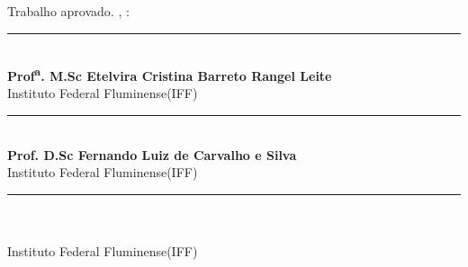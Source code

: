 \documentclass[
	12pt,				%
	openright,			%
	oneside,			%
	a4paper,			%
	english,			%
	french,				%
	spanish,			%
	brazil,				%
	]{abntex2}
\renewcommand{\assinatura}[1]{%
  \vspace{1cm}
  \begin{center}
    \begin{minipage}{0.9\textwidth}
      \centering
      \rule{12cm}{0.4pt}\\ %
      #1
    \end{minipage}
  \end{center}
}
\begin{document}
\renewcommand{\lstlistingname}{Listagem}


\frenchspacing


\imprimircapa

\imprimirfolhaderosto

\begin{folhadeaprovacao}
    \begin{center}
{\ABNTEXchapterfont\large\imprimirautor}

\vspace*{\fill}

\ABNTEXchapterfont\bfseries\Large\imprimirtitulo
\end{center}
\vspace*{\fill}

\hspace{.45\textwidth}
\begin{minipage}{.5\textwidth}
\SingleSpacing
    \imprimirpreambulo
\end{minipage}%
\vspace*{\fill}

Trabalho aprovado. \imprimirlocal, \imprimirdata:
\assinatura{\textbf{Prof\textsuperscript{a}. M.Sc Etelvira Cristina Barreto Rangel Leite} \\ Instituto Federal Fluminense(IFF)}

\assinatura{\textbf{Prof. D.Sc Fernando Luiz de Carvalho e Silva} \\ Instituto Federal Fluminense(IFF)}

\assinatura{\textbf{\imprimirorientador} \\ Instituto Federal Fluminense(IFF)}

%
\begin{center}
\vfill
{\large\imprimirlocal}
\par
{\large\imprimirdata}
\end{center}
\end{folhadeaprovacao}
\end{document}
